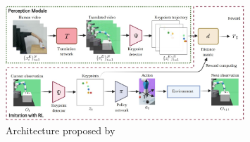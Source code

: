 \begin{figure}[t]
    \centering
    \includegraphics[width=0.8\textwidth]{figures/images/learning_by_watching/learning_by_watching.jpg}
    \caption{Architecture proposed by~\cite{xiong2021learning_by_watching}}
    \label{fig:lbw}
\end{figure}
